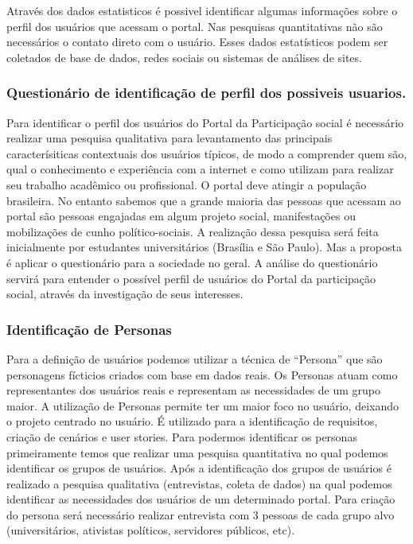 	Através dos dados estatisticos é possivel identificar algumas informações sobre o perfil dos usuários que acessam o portal. Nas pesquisas quantitativas não são necessários o contato direto com o usuário. Esses dados estatísticos podem ser coletados de base de dados, redes sociais ou sistemas de análises de sites.

\subsubsection{Questionário de identificação de perfil dos possiveis usuarios.}

Para identificar o perfil dos usuários do Portal da Participação social é necessário realizar uma pesquisa qualitativa para levantamento das principais caracterísiticas contextuais dos usuários típicos, de modo a comprender quem são, qual o conhecimento e experiência com a internet e como utilizam para realizar seu trabalho acadêmico ou profissional. 
O portal deve atingir a população brasileira. No entanto sabemos que a grande maioria das pessoas que acessam ao portal são pessoas engajadas em algum projeto social, manifestações ou mobilizações de cunho político-sociais. A realização dessa pesquisa será feita inicialmente por estudantes universitários (Brasília e São Paulo). Mas a proposta é aplicar o questionário para a sociedade no geral.
A análise do questionário servirá para entender o possível perfil de usuários do Portal da participação social, através da investigação de seus interesses.


\subsubsection{Identificação de Personas}

Para a definição de usuários podemos utilizar a técnica de “Persona” que são personagens fícticios criados com base em dados reais. Os Personas atuam como representantes dos usuários reais e representam as necessidades de um grupo maior. 
A utilização de Personas permite ter um maior foco no usuário, deixando o projeto centrado no usuário. É utilizado para a identificação de requisitos, criação de cenários e user stories. 
	Para podermos identificar os personas primeiramente temos que realizar uma pesquisa quantitativa no qual podemos identificar os grupos de usuários. Após a identificação dos grupos de usuários é realizado a pesquisa qualitativa (entrevistas, coleta de dados) na qual podemos identificar as necessidades dos usuários de um determinado portal.
Para criação do persona será necessário realizar entrevista com 3 pessoas de cada grupo alvo (universitários, ativistas políticos, servidores públicos, etc).

